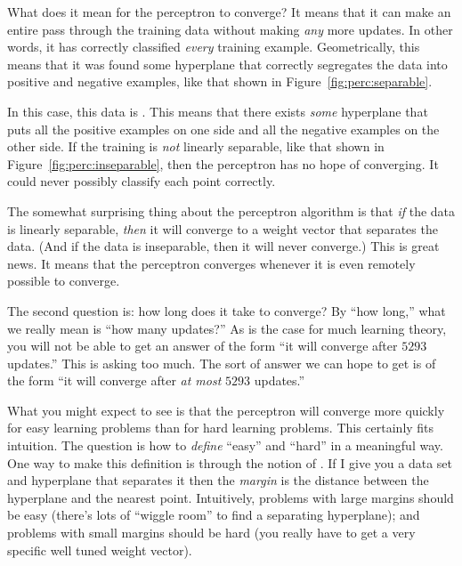 
What does it mean for the perceptron to converge?  It means that it
can make an entire pass through the training data without making
\emph{any} more updates.  In other words, it has correctly classified
\emph{every} training example.  Geometrically, this means that it was
found some hyperplane that correctly segregates the data into positive
and negative examples, like that shown in
Figure~\ref{fig:perc:separable}.


In this case, this data is .  This means
that there exists \emph{some} hyperplane that puts all the positive
examples on one side and all the negative examples on the other side.
If the training is \emph{not} linearly separable, like that shown in
Figure~\ref{fig:perc:inseparable}, then the perceptron has no hope of
converging.  It could never possibly classify each point correctly.

The somewhat surprising thing about the perceptron algorithm is that
\emph{if} the data is linearly separable, \emph{then} it will converge
to a weight vector that separates the data.  (And if the data is
inseparable, then it will never converge.)  This is great news.  It
means that the perceptron converges whenever it is even remotely
possible to converge.

The second question is: how long does it take to converge?  By ``how
long,'' what we really mean is ``how many updates?''  As is the case
for much learning theory, you will not be able to get an answer of the
form ``it will converge after $5293$ updates.''  This is asking too
much.  The sort of answer we can hope to get is of the form ``it will
converge after \emph{at most} $5293$ updates.''

What you might expect to see is that the perceptron will converge more
quickly for easy learning problems than for hard learning problems.
This certainly fits intuition.  The question is how to \emph{define}
``easy'' and ``hard'' in a meaningful way.  One way to make this
definition is through the notion of .  If I give you a
data set and hyperplane that separates it
then the \emph{margin} is the distance
between the hyperplane and the nearest point.  Intuitively, problems
with large margins should be easy (there's lots of ``wiggle room'' to
find a separating hyperplane); and problems with small margins should
be hard (you really have to get a very specific well tuned weight
vector).


